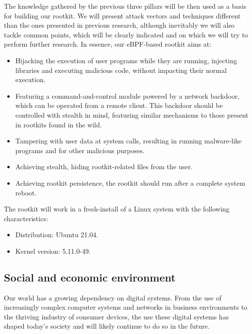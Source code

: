 The knowledge gathered by the previous three pillars will be then used as a
basis for building our rootkit. We will present attack vectors and
techniques different than the ones presented in previous research, although
inevitably we will also tackle common points, which will be clearly
indicated and on which we will try to perform further research. In essence,
our eBPF-based rootkit aims at:
\begin{itemize}
\item Hijacking the execution of user programs while they are running, injecting libraries and executing malicious code, without impacting their normal execution.
\item Featuring a command-and-control module powered by a network backdoor, which can be operated from a remote client. This backdoor should be controlled with stealth in mind, featuring similar mechanisms to those present in rootkits found in the wild.
\item Tampering with user data at system calls, resulting in running malware-like programs and for other malicious purposes.
\item Achieving stealth, hiding rootkit-related files from the user.
\item Achieving rootkit persistence, the rootkit should run after a complete system reboot.
\
\end{itemize}

The rootkit will work in a fresh-install of a Linux system with the following characteristics:
\begin{itemize}
\item Distribution: Ubuntu 21.04.
\item Kernel version: 5.11.0-49.
\end{itemize}


\subsection{Social and economic environment}\label{sec:social_econ_env}

Our world has a growing dependency on digital systems. From the use of
increasingly complex computer systems and networks in business environments
to the thriving industry of consumer devices, the use these digital systems
has shaped today's society and will likely continue to do so in the future.

